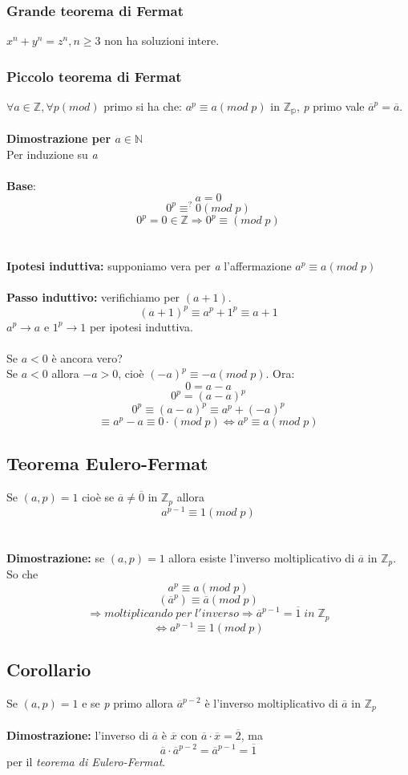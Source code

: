 \subsubsection{Grande teorema di Fermat}
\(x^n+y^n=z^n, n\geq 3\) non ha soluzioni intere.

\subsubsection{Piccolo teorema di Fermat}
\(\forall a\in\mathbb{Z}, \forall p(mod)\) primo si ha che: \(a^p\equiv a(mod\;p)\) in \(\mathbb{Z_p}\), \textit{p} primo vale \(\overline{a}^p=\overline{a}\).
\\\\
\textbf{Dimostrazione per \(a\in\mathbb{N}\)}
\\Per induzione su \textit{a}
\\\\\textbf{Base}: \[a=0\]
\[0^p\equiv ^? 0(mod\;p)\]
\[0^p=0\in\mathbb{Z}\Rightarrow 0^p\equiv (mod\;p)\]
\\\\
\textbf{Ipotesi induttiva:} supponiamo vera per \textit{a} l'affermazione \(a^p\equiv a(mod\;p)\)
\\\\
\textbf{Passo induttivo:} verifichiamo per \((a+1)\).
\[(a+1)^p\equiv a^p+1^p \equiv a+1\]
\(a^p\rightarrow a\) e \(1^p\rightarrow 1\) per ipotesi induttiva.
\\\\
Se \(a<0\) è ancora vero?
\\ Se \(a<0\) allora \(-a>0\), cioè \((-a)^p\equiv -a(mod\;p)\). 
Ora:
\[0=a-a\]
\[0^p=(a-a)^p\]
\[0^p\equiv (a-a)^p\equiv a^p+(-a)^p\]
\[\equiv a^p-a\equiv 0\cdot (mod\;p)\Leftrightarrow a^p\equiv a(mod\;p)\]

\subsection{Teorema Eulero-Fermat}
Se \((a,p)=1\) cioè se \(\overline{a}\neq \overline{0}\) in \(\mathbb{Z}_p\) allora
\[a^{p-1}\equiv 1(mod\;p)\]
\\\\
\textbf{Dimostrazione:} se \((a,p)=1\) allora esiste l'inverso moltiplicativo di \(\overline{a}\) in \(\mathbb{Z}_p\).
\\
So che \[a^p\equiv a(mod\;p)\]
\[(\overline{a}^p)\equiv \overline{a}(mod\;p)\]
\[\Rightarrow moltiplicando\;per\;l'inverso \Rightarrow \overline{a}^{p-1}=\overline{1}\;in\;\mathbb{Z}_p\]
\[\Leftrightarrow a^{p-1}\equiv 1(mod\;p)\]

\subsection{Corollario}
Se \((a,p)=1\) e se \textit{p} primo allora \(\overline{a}^{p-2}\) è l'inverso moltiplicativo di \(\overline{a}\) in \(\mathbb{Z}_p\)
\\\\
\textbf{Dimostrazione:} l'inverso di \(\overline{a}\) è \(\overline{x}\) con \(\overline{a}\cdot\overline{x}=\overline{2}\), 
ma \[\overline{a}\cdot\overline{a}^{p-2}=\overline{a}^{p-1}=\overline{1}\]
per il \textit{teorema di Eulero-Fermat}.
